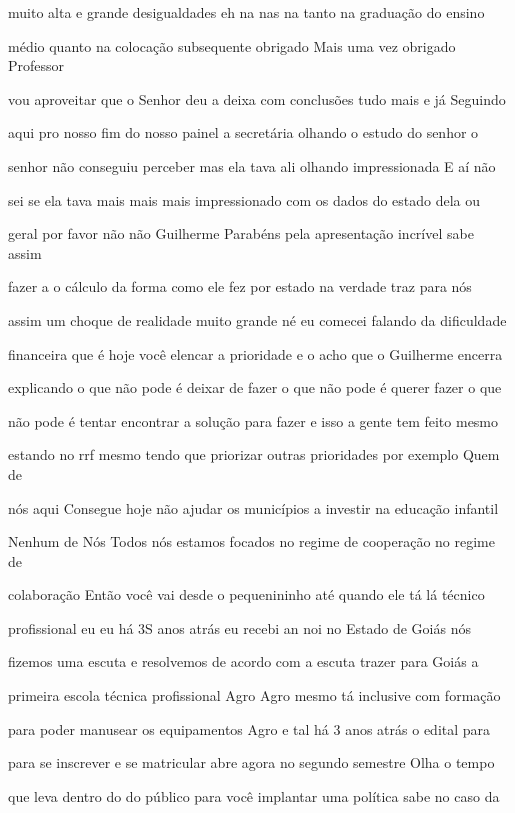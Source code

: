 \documentclass[a4paper,12pt]{article}
\begin{document}
muito alta e grande desigualdades eh na nas na tanto na graduação do ensino

médio quanto na colocação subsequente obrigado Mais uma vez obrigado Professor

vou aproveitar que o Senhor deu a deixa com conclusões tudo mais e já Seguindo

aqui pro nosso fim do nosso painel a secretária olhando o estudo do senhor o

senhor não conseguiu perceber mas ela tava ali olhando impressionada E aí não

sei se ela tava mais mais mais impressionado com os dados do estado dela ou

geral por favor não não Guilherme Parabéns pela apresentação incrível sabe assim

fazer a o cálculo da forma como ele fez por estado na verdade traz para nós

assim um choque de realidade muito grande né eu comecei falando da dificuldade

financeira que é hoje você elencar a prioridade e o acho que o Guilherme encerra

explicando o que não pode é deixar de fazer o que não pode é querer fazer o que

não pode é tentar encontrar a solução para fazer e isso a gente tem feito mesmo

estando no rrf mesmo tendo que priorizar outras prioridades por exemplo Quem de

nós aqui Consegue hoje não ajudar os municípios a investir na educação infantil

Nenhum de Nós Todos nós estamos focados no regime de cooperação no regime de

colaboração Então você vai desde o pequenininho até quando ele tá lá técnico

profissional eu eu há 3S anos atrás eu recebi an noi no Estado de Goiás nós

fizemos uma escuta e resolvemos de acordo com a escuta trazer para Goiás a

primeira escola técnica profissional Agro Agro mesmo tá inclusive com formação

para poder manusear os equipamentos Agro e tal há 3 anos atrás o edital para

para se inscrever e se matricular abre agora no segundo semestre Olha o tempo

que leva dentro do do público para você implantar uma política sabe no caso da
\end{document}
